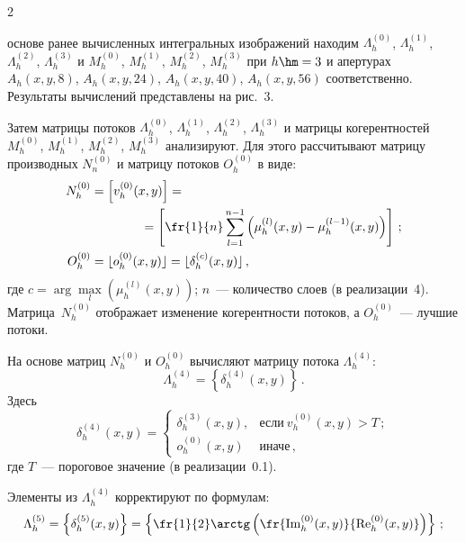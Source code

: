 \begin{multicols}{2}

\noindent
 основе ранее вычисленных интегральных 
изоб\-ра\-же\-ний находим $\Lambda_h^{(0)}$, $\Lambda_h^{(1)}$,  $\Lambda_h^{(2)}$, 
$\Lambda_h^{(3)}$ и $M_h^{(0)}$, $M_h^{(1)}$, $M_h^{(2)}$, $M_h^{(3)}$ при 
$h\hm=3$ и апертурах $A_h(x,y,8)$, $A_h(x,y,24)$, $A_h(x,y,40)$, $A_h(x,y,56)$ 
соответственно. Результаты вычислений представлены на рис.~3.
  
  Затем матрицы потоков $\Lambda_h^{(0)}$, $\Lambda_h^{(1)}$,  $\Lambda_h^{(2)}$, 
$\Lambda_h^{(3)}$ и матрицы когерентностей $M_h^{(0)}$, $M_h^{(1)}$, $M_h^{(2)}$, 
$M_h^{(3)}$ анализируют. Для этого рассчитывают матрицу производных 
$N_n^{(0)}$ и мат\-ри\-цу потоков $O_h^{(0)}$ в виде:
  \begin{align*}
  N_h^{(0)} &= \left [ v_h^{(0)}(x,y)\right] ={}\\
  &\hspace*{14mm}{}=\left[ \fr{1}{n}\sum\limits_{l=1}^{n-
1} \left( \mu_h^{(l)}(x,y)-\mu_h^{(l-1)}(x,y)\right)\right]\,;\\
  O_h^{(0)} &= \lfloor o_h^{(0)}(x,y)\rfloor =\lfloor \delta_h^{(c)}(x,y)\rfloor\,,
  \end{align*}
где $c=\arg \max\limits_l \left( \mu_h^{(l)}(x,y)\right)$; $n$~--- количество слоев 
(в реализации~4). Матрица~$N_h^{(0)}$ отображает изменение когерентности 
потоков, а $O_h^{(0)}$~--- лучшие потоки.
  
  На основе матриц $N_h^{(0)}$ и $O_h^{(0)}$ вычисляют матрицу потока 
$\Lambda_h^{(4)}$: 
\begin{equation}
 \Lambda_h^{(4)} =\left\{ \delta_h^{(4)} (x,y)\right\}\,.
 \label{e11-g}
 \end{equation}
 Здесь
 \begin{equation*}
  \delta_h^{(4)}(x,y)=
  \begin{cases}
\delta_h^{(3)}(x,y), &\mbox{если}\ v_h^{(0)}(x,y)>T\,;\\
  o_h^{(0)}(x,y) & \mbox{иначе}\,,
  \end{cases}
  \end{equation*}
где $T$~--- пороговое значение (в реализации~0.1).
  
  Элементы из $\Lambda_h^{(4)}$ корректируют по формулам:
  \begin{equation*}
  \Lambda_h^{(5)} = \left\{ \delta_h^{(5)}(x,y)\right\}= \left\{ \fr{1}{2}\arctg\left( 
\fr{\mathrm{Im}_h^{(0)}(x,y)}{\mathrm{Re}_h^{(0)}(x,y)}\right)\right\}\,;
\end{equation*}


\end{multicols}
